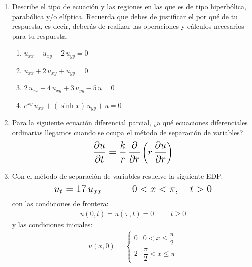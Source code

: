 \begin{enumerate}
\item Describe el tipo de ecuación y las regiones en las que es de tipo hiperbólica, parabólica y/o elíptica. Recuerda que debes de justificar el por qué de tu respuesta, es decir, deberás de realizar las operaciones y cálculos necesarios para tu respuesta.

\begin{enumerate}
\Large
\item $u_{xx} - u_{xy} - 2 \, u_{yy} = 0$
\item $u_{xx} + 2 \, u_{xy} + u_{yy} = 0$
\item $2 \, u_{xx} + 4 \, u_{xy} + 3 \, u_{yy} - 5 \, u = 0$
\item $e^{x y} \, u_{xx} + (\sinh x) \, u_{yy} + u = 0$
\end{enumerate}
\item Para la siguiente ecuación diferencial parcial, ¿a qué ecuaciones diferenciales ordinarias llegamos cuando se ocupa el método de separación de variables?
\begin{align*}
\mbox{\Large $ \displaystyle
\pdv{u}{t} = \dfrac{k}{r} \, \pdv{r} \left( r \, \pdv{u}{r} \right)$}
\end{align*}
\item Con el método de separación de variables resuelve la siguiente EDP:
\begin{align*}
\mbox{\Large $u_{t} = 17 \, u_{xx} \hspace{1.5cm} 0 < x < \pi, \hspace{0.5cm} t > 0 $}
\end{align*}
con las condiciones de frontera:
\begin{align*}
u(0,t) = u(\pi, t) = 0 \hspace{1cm} t \geq 0
\end{align*}
y las condiciones iniciales:
\begin{align*}
u(x, 0) = \begin{cases}
0 & 0 < x \leq \dfrac{\pi}{2} \\
2 & \dfrac{\pi}{2} < x \leq \pi
\end{cases}
\end{align*}


\end{enumerate}
